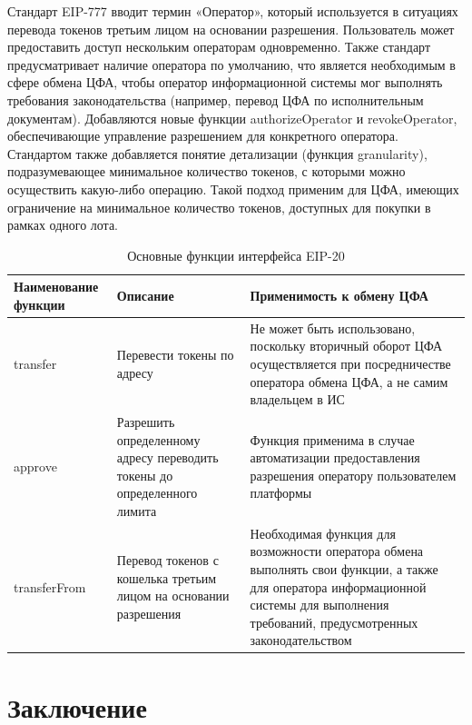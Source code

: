 \documentclass[a4paper, 10pt]{article}
\begin{document}
	Стандарт EIP-777 вводит термин «Оператор», который используется в ситуациях перевода токенов третьим лицом на основании разрешения. Пользователь может предоставить доступ нескольким операторам одновременно. Также стандарт предусматривает наличие оператора по умолчанию, что является необходимым в сфере обмена ЦФА, чтобы оператор информационной системы мог выполнять требования законодательства (например, перевод ЦФА по исполнительным документам). Добавляются новые функции authorizeOperator и revokeOperator, обеспечивающие управление разрешением для конкретного оператора. Стандартом также добавляется понятие детализации (функция granularity), подразумевающее минимальное количество токенов, с которыми можно осуществить какую-либо операцию. Такой подход применим для ЦФА, имеющих ограничение на минимальное количество токенов, доступных для покупки в рамках одного лота. 
	
	\begin{longtable}{|p{3.5cm}|p{6.1cm}|p{6.2cm}|}
		\caption{Основные функции интерфейса EIP-20}
		\label{table:erc20}\\
		\hline
		
		\textbf{Наименование функции} 
		& \textbf{Описание} 
		& \textbf{Применимость к обмену ЦФА}\\
		\hline
		
		transfer
		& Перевести токены по адресу
		& Не может быть использовано, поскольку вторичный оборот ЦФА осуществляется при посредничестве оператора обмена ЦФА, а не самим владельцем в ИС\\
		\hline
		
		approve
		& Разрешить определенному адресу переводить токены до определенного лимита
		& Функция применима в случае автоматизации предоставления разрешения оператору пользователем платформы\\
		\hline
		
		transferFrom
		& Перевод токенов с кошелька третьим лицом на основании разрешения
		& Необходимая функция для возможности оператора обмена выполнять свои функции, а также для оператора информационной системы для выполнения требований, предусмотренных законодательством\\
		\hline
	\end{longtable}
	
	\section*{Заключение}
	
\end{document}

